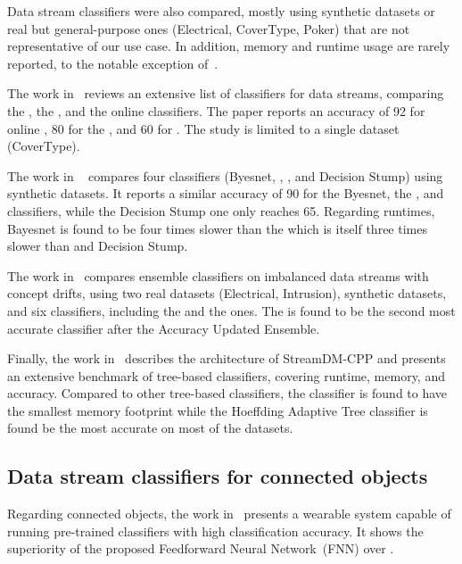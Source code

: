 Data stream classifiers were also compared, mostly using synthetic datasets
or real but general-purpose ones (Electrical, CoverType, Poker) that are
not representative of our use case. In addition, memory and runtime usage 
are rarely reported, to the notable exception of~\cite{StreamDM-CPP}.

The work
in~\cite{prasad2016stream} reviews an extensive list of classifiers for
data streams, comparing the \hoeffdingtree, the \naivebayes, and the \knn
online classifiers. The paper reports an accuracy of 92 for online \knn, 80
for the \hoeffdingtree, and 60 for \naivebayes. The study is limited to a
single dataset (CoverType). 

The work in ~\cite{kaur2020} compares four classifiers (Byesnet,
\hoeffdingtree, \naivebayes, and Decision Stump) using synthetic datasets.
It reports a similar accuracy of 90 for the Byesnet, the
\hoeffdingtree, and \naivebayes classifiers, while the Decision Stump one
only reaches 65. Regarding runtimes, Bayesnet is found to be four times
slower than the \hoeffdingtree which is itself three times slower than
\naivebayes and Decision Stump.

The work in~\cite{priya2020comprehensive} compares ensemble classifiers on
imbalanced data streams with concept drifts, using two real datasets
(Electrical, Intrusion), synthetic datasets, and six classifiers, including the
\naivebayes and the \hoeffdingtree ones. The \hoeffdingtree is found to be
the second most accurate classifier after the Accuracy Updated Ensemble.

Finally, the work in~\cite{StreamDM-CPP} describes the architecture of
StreamDM-CPP and presents an extensive benchmark of tree-based classifiers,
covering runtime, memory, and accuracy. Compared to other tree-based
classifiers, the \hoeffdingtree classifier is found to have the smallest
memory footprint while the Hoeffding Adaptive Tree classifier is found be
the most accurate on most of the datasets. 

\subsection{Data stream classifiers for connected objects}

Regarding connected objects, the work in~\cite{omid_2019} presents a
wearable system capable of running pre-trained classifiers  with high classification accuracy. It shows
the superiority of the proposed Feedforward Neural
Network~(FNN) over \knn. 




